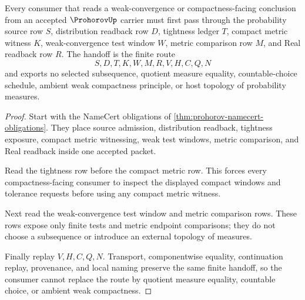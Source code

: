 \begin{theorem}
\label{thm:prohorov-tightness-metric-handoff}
Every consumer that reads a weak-convergence or compactness-facing conclusion from an accepted $\ProhorovUp$ carrier must first pass through the probability source row $S$, distribution readback row $D$, tightness ledger $T$, compact metric witness $K$, weak-convergence test window $W$, metric comparison row $M$, and Real readback row $R$. The handoff is the finite route
$$
S,D,T,K,W,M,R,V,H,C,Q,N
$$
and exports no selected subsequence, quotient measure equality, countable-choice schedule, ambient weak compactness principle, or host topology of probability measures.
\end{theorem}
\begin{proof}
Start with the NameCert obligations of \autoref{thm:prohorov-namecert-obligations}. They place source admission, distribution readback, tightness exposure, compact metric witnessing, weak test windows, metric comparison, and Real readback inside one accepted packet.

Read the tightness row before the compact metric row. This forces every compactness-facing consumer to inspect the displayed compact windows and tolerance requests before using any compact metric witness.

Next read the weak-convergence test window and metric comparison rows. These rows expose only finite tests and metric endpoint comparisons; they do not choose a subsequence or introduce an external topology of measures.

Finally replay $V,H,C,Q,N$. Transport, componentwise equality, continuation replay, provenance, and local naming preserve the same finite handoff, so the consumer cannot replace the route by quotient measure equality, countable choice, or ambient weak compactness.
\end{proof}


